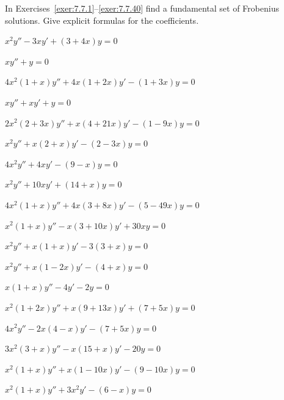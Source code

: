 \exercises In Exercises~\ref{exer:7.7.1}--\ref{exer:7.7.40} find a fundamental set of Frobenius solutions. Give explicit formulas for the coefficients.

\begin{exerciselist}
  \item\label{exer:7.7.1} $x^{2}y''-3xy'+(3+4x)y=0$

  \item\label{exer:7.7.2} $xy''+y=0$

  \item\label{exer:7.7.3} $4x^{2}(1+x)y''+4x(1+2x)y'-(1+3x)y=0$

  \item\label{exer:7.7.4} $xy''+xy'+y=0$

  \item\label{exer:7.7.5} $2x^{2}(2+3x)y''+x(4+21x)y'-(1-9x)y=0$

  \item\label{exer:7.7.6} $x^{2}y''+x(2+x)y'-(2-3x)y=0$

  \item\label{exer:7.7.7} $4x^{2}y''+4xy'-(9-x)y=0$

  \item\label{exer:7.7.8} $x^{2}y''+10xy'+(14+x)y=0$

  \item\label{exer:7.7.9} $4x^{2}(1+x)y''+4x(3+8x)y'-(5-49x)y=0$

  \item\label{exer:7.7.10} $x^{2}(1+x)y''-x(3+10x)y'+30xy=0$

  \item\label{exer:7.7.11} $x^{2}y''+x(1+x)y'-3(3+x)y=0$

  \item\label{exer:7.7.12} $x^{2}y''+x(1-2x)y'-(4+x)y=0$

  \item\label{exer:7.7.13} $x(1+x)y''-4y'-2y=0$

  \item\label{exer:7.7.14} $x^{2}(1+2x)y''+x(9+13x)y'+(7+5x)y=0$

  \item\label{exer:7.7.15} $4x^{2}y''-2x(4-x)y'-(7+5x)y=0$

  \item\label{exer:7.7.16} $3x^{2}(3+x)y''-x(15+x)y'-20y=0$

  \item\label{exer:7.7.17} $x^{2}(1+x)y''+x(1-10x)y'-(9-10x)y=0$

  \item\label{exer:7.7.18} $x^{2}(1+x)y''+3x^{2}y'-(6-x)y=0$


\end{exerciselist}
